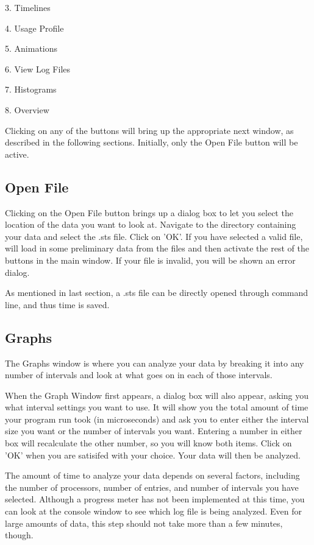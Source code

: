 \documentclass[10pt,dvips]{article}
\begin{document}
3. Timelines

4. Usage Profile

5. Animations

6. View Log Files

7. Histograms

8. Overview

Clicking on any of the buttons will bring up the appropriate next window, as
described in the following sections.  Initially, only the Open File button
will be active.

\subsection{Open File}

   Clicking on the Open File button brings up a dialog box to let you select
   the location of the data you want to look at.  Navigate to the directory
   containing your data and select the .sts file.  Click on 'OK'.  If you
   have selected a valid file, \projections{} will load in some preliminary data
   from the files and then activate the rest of the buttons in the main window.
   If your file is invalid, you will be shown an error dialog.

   As mentioned in last section, a .sts file can be directly opened through command
   line, and thus time is saved.

\subsection{Graphs}

   The Graphs window is where you can analyze your data by breaking it into
   any number of intervals and look at what goes on in each of those intervals.

   When the Graph Window first appears, a dialog box will also appear, asking
   you what interval settings you want to use.  It will show you the total
   amount of time your program run took (in microseconds) and ask you to enter
   either the interval size you want or the number of intervals you want.
   Entering a number in either box will recalculate the other number, so you
   will know both items. Click on 'OK' when you are satisifed with your choice.
   Your data will then be analyzed.

   The amount of time to analyze your data depends on several factors, including
   the number of processors, number of entries, and number of intervals you have
   selected.  Although a progress meter has not been implemented at this time,
   you can look at the console window to see which log file is being analyzed.
   Even for large amounts of data, this step should not take more than a few
   minutes, though.
\end{document}
